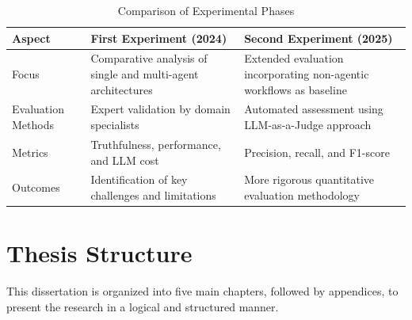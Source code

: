         \begin{table}[h]
        \centering
        \caption{Comparison of Experimental Phases}
        \begin{tabular}{|p{}|p{}|p{}|}
        \hline
        \textbf{Aspect} & \textbf{First Experiment (2024)} & \textbf{Second Experiment (2025)} \\
        \hline
        Focus & Comparative analysis of single and multi-agent architectures & Extended evaluation incorporating non-agentic workflows as baseline \\
        \hline
        Evaluation Methods & Expert validation by domain specialists & Automated assessment using LLM-as-a-Judge approach \\
        \hline
        Metrics & Truthfulness, performance, and LLM cost & Precision, recall, and F1-score \\
        \hline
        Outcomes & Identification of key challenges and limitations & More rigorous quantitative evaluation methodology \\
        \hline
        \end{tabular}
        \label{tab:experiments}
        \end{table}

    

\section{Thesis Structure}


    This dissertation is organized into five main chapters, followed by appendices, to present the research in a logical and structured manner.

